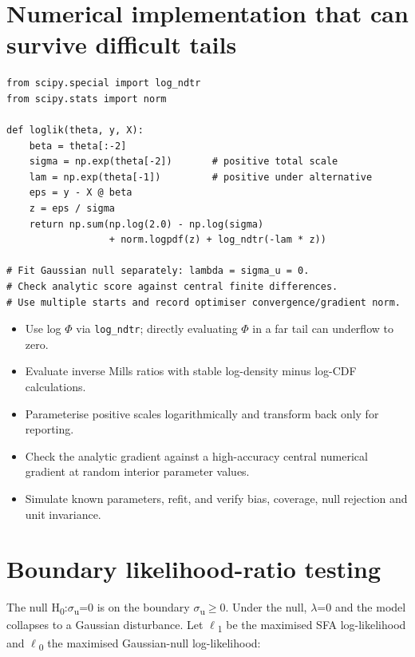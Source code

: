 \hypertarget{numerical-implementation-that-can-survive-difficult-tails}{%
\section{Numerical implementation that can survive difficult
tails}\label{numerical-implementation-that-can-survive-difficult-tails}}

\begin{verbatim}
from scipy.special import log_ndtr
from scipy.stats import norm

def loglik(theta, y, X):
    beta = theta[:-2]
    sigma = np.exp(theta[-2])       # positive total scale
    lam = np.exp(theta[-1])         # positive under alternative
    eps = y - X @ beta
    z = eps / sigma
    return np.sum(np.log(2.0) - np.log(sigma)
                  + norm.logpdf(z) + log_ndtr(-lam * z))

# Fit Gaussian null separately: lambda = sigma_u = 0.
# Check analytic score against central finite differences.
# Use multiple starts and record optimiser convergence/gradient norm.
\end{verbatim}

\begin{itemize}
\tightlist
\item
  Use log \ensuremath{\Phi } via \texttt{log\_ndtr}; directly evaluating \ensuremath{\Phi } in a far tail
  can underflow to zero.
\item
  Evaluate inverse Mills ratios with stable log-density minus log-CDF
  calculations.
\item
  Parameterise positive scales logarithmically and transform back only
  for reporting.
\item
  Check the analytic gradient against a high-accuracy central numerical
  gradient at random interior parameter values.
\item
  Simulate known parameters, refit, and verify bias, coverage, null
  rejection and unit invariance.
\end{itemize}

\hypertarget{boundary-likelihood-ratio-testing}{%
\section{Boundary likelihood-ratio
testing}\label{boundary-likelihood-ratio-testing}}

The null H\textsubscript{0}:\ensuremath{\sigma }\textsubscript{u}=0 is on the boundary
\ensuremath{\sigma }\textsubscript{u}\ensuremath{\geq }0. Under the null, \ensuremath{\lambda }=0 and the model collapses to a
Gaussian disturbance. Let \ensuremath{\ell }\textsubscript{1} be the maximised SFA
log-likelihood and \ensuremath{\ell }\textsubscript{0} the maximised Gaussian-null
log-likelihood:

